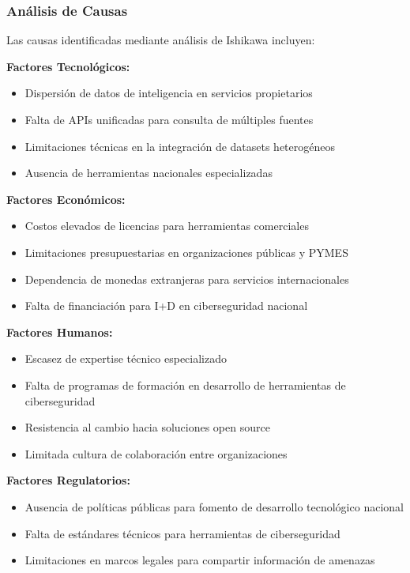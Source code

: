 \subsubsection{Análisis de Causas}
Las causas identificadas mediante análisis de Ishikawa incluyen:

\textbf{Factores Tecnológicos:}
\begin{itemize}
    \item Dispersión de datos de inteligencia en servicios propietarios
    \item Falta de APIs unificadas para consulta de múltiples fuentes
    \item Limitaciones técnicas en la integración de datasets heterogéneos
    \item Ausencia de herramientas nacionales especializadas
\end{itemize}

\textbf{Factores Económicos:}
\begin{itemize}
    \item Costos elevados de licencias para herramientas comerciales
    \item Limitaciones presupuestarias en organizaciones públicas y PYMES
    \item Dependencia de monedas extranjeras para servicios internacionales
    \item Falta de financiación para I+D en ciberseguridad nacional
\end{itemize}

\textbf{Factores Humanos:}
\begin{itemize}
    \item Escasez de expertise técnico especializado
    \item Falta de programas de formación en desarrollo de herramientas de ciberseguridad
    \item Resistencia al cambio hacia soluciones open source
    \item Limitada cultura de colaboración entre organizaciones
\end{itemize}

\textbf{Factores Regulatorios:}
\begin{itemize}
    \item Ausencia de políticas públicas para fomento de desarrollo tecnológico nacional
    \item Falta de estándares técnicos para herramientas de ciberseguridad
    \item Limitaciones en marcos legales para compartir información de amenazas
\end{itemize}

